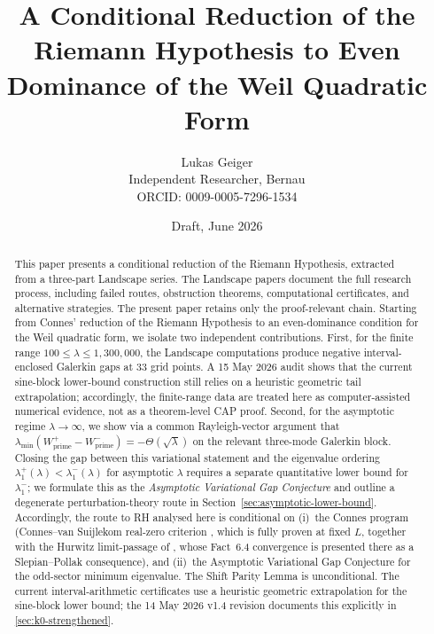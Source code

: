 \documentclass[11pt,a4paper]{article}
\title{A Conditional Reduction of the Riemann Hypothesis to Even Dominance of the Weil Quadratic Form}
\author{Lukas Geiger\\Independent Researcher, Bernau\\ORCID: 0009-0005-7296-1534}
\date{Draft, June 2026}
\theoremstyle{remark}
\theoremstyle{plain}
\begin{document}
\maketitle

\begin{abstract}
This paper presents a conditional reduction of the Riemann Hypothesis,
extracted from a three-part Landscape series. The Landscape papers document
the full research process, including failed routes, obstruction theorems,
computational certificates, and alternative strategies. The present paper
retains only the proof-relevant chain.
Starting from Connes' reduction of the Riemann Hypothesis to an even-dominance
condition for the Weil quadratic form, we isolate two independent contributions.
First, for the finite range $100 \leq \lambda \leq 1{,}300{,}000$, the Landscape
computations produce negative interval-enclosed Galerkin gaps at 33 grid points.
A 15 May 2026 audit shows that the current sine-block lower-bound construction
still relies on a heuristic geometric tail extrapolation; accordingly, the
finite-range data are treated here as computer-assisted numerical evidence, not
as a theorem-level CAP proof. Second, for the asymptotic regime
$\lambda \to \infty$, we show via
a common Rayleigh-vector argument that
$\lambda_{\min}(W^+_{\mathrm{prime}}-W^-_{\mathrm{prime}})=-\Theta(\sqrt\lambda)$
on the relevant three-mode Galerkin block. Closing the gap between this
variational statement and the eigenvalue ordering
$\lambda_1^+(\lambda)<\lambda_1^-(\lambda)$ for asymptotic $\lambda$ requires a
separate quantitative lower bound for $\lambda_1^-$; we formulate this as the
\emph{Asymptotic Variational Gap Conjecture} and outline a degenerate
perturbation-theory route in Section~\ref{sec:asymptotic-lower-bound}.
Accordingly, the route to RH analysed here is conditional on (i)~the
Connes program (Connes--van Suijlekom real-zero criterion
\cite{ConnesvS2025}, which is fully proven at fixed $L$, together with
the Hurwitz limit-passage of \cite[Sec.~6.4--6.6]{Connes2026}, whose
Fact~6.4 convergence is presented there as a Slepian--Pollak consequence),
and (ii)~the
Asymptotic Variational Gap Conjecture for the odd-sector minimum
eigenvalue. The Shift Parity Lemma is unconditional. The current
interval-arithmetic certificates use a heuristic geometric extrapolation
for the sine-block lower bound; the 14 May 2026 v1.4 revision documents
this explicitly in
\cref{sec:k0-strengthened}.


\end{abstract}
\end{document}
